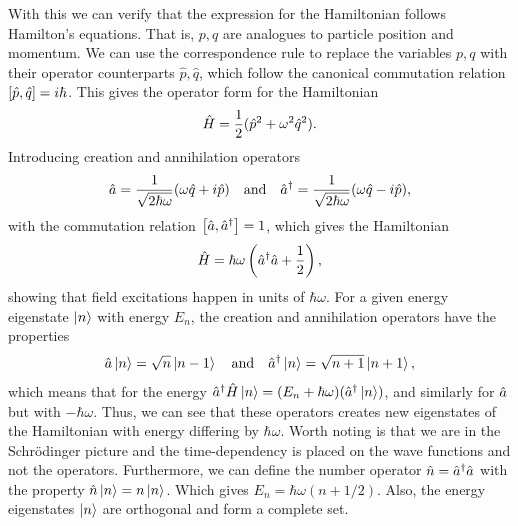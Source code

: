 With this we can verify that the expression for the Hamiltonian follows Hamilton's equations. That is, $p,q$ are analogues to particle position and momentum.  We can use the correspondence rule to replace the variables $p,q$ with their operator counterparts $\hat{p},\hat{q}$, which follow the canonical commutation relation $\comm{\hat{p}}{\hat{q}} = i\hbar$. This gives the operator form for the Hamiltonian
\begin{equation}
    \hat{H} = \frac{1}{2} (\hat{p}^2 + \omega^2\hat{q}^2).
\end{equation}
Introducing creation and annihilation operators
\begin{equation}
    \hat{a} = \frac{1}{\sqrt{2\hbar\omega}} (\omega \hat{q} + i\hat{p}) \quad\text{and}\quad \hat{a}^\dagger = \frac{1}{\sqrt{2\hbar\omega}} (\omega \hat{q} - i\hat{p}),
\end{equation}
with the commutation relation $\comm{\a}{\ad} = 1$, which gives the Hamiltonian 
\begin{equation}
    \hat{H} = \hbar\omega \left(\hat{a}^\dagger\hat{a} + \frac{1}{2}\right),
\end{equation}
showing that field excitations happen in units of $\hbar\omega$. For a given energy eigenstate $\ket{n}$ with energy $E_n$, the creation and annihilation operators have the properties
\begin{equation}
    \hat{a}\ket{n} = \sqrt{n}\ket{n-1} \quad\text{and}\quad \hat{a}^\dagger\ket{n} = \sqrt{n+1}\ket{n+1},
\end{equation}
which means that for the energy $\hat{a}^\dagger\hat{H}\ket{n} = (E_n + \hbar\omega)(\hat{a}^\dagger\ket{n})$, and similarly for $\hat{a}$ but with $-\hbar\omega$. Thus, we can see that these operators creates new eigenstates of the Hamiltonian with energy differing by $\hbar\omega$. Worth noting is that we are in the Schrödinger picture and the time-dependency is placed on the wave functions and not the operators. Furthermore, we can define the number operator $\hat{n} = \hat{a}^\dagger\hat{a}$ with the property $\hat{n}\ket{n} = n\ket{n}$. Which gives $E_n = \hbar\omega(n + 1/2)$. Also, the energy eigenstates $\ket{n}$ are orthogonal and form a complete set.

